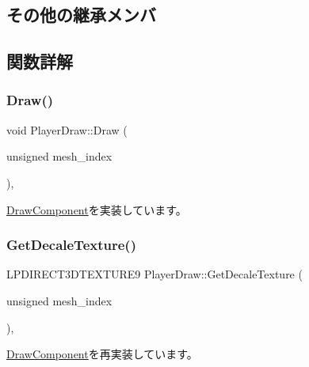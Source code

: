 \subsection*{その他の継承メンバ}


\subsection{関数詳解}
\mbox{\label{class_player_draw_a1d58f14658bf5e058f67c6754d9898e7}} 
\subsubsection{\texorpdfstring{Draw()}{Draw()}}
{\footnotesize\ttfamily void Player\+Draw\+::\+Draw (\begin{DoxyParamCaption}\item[{unsigned}]{mesh\+\_\+index }\end{DoxyParamCaption})\hspace{0.3cm}{\ttfamily [override]}, {\ttfamily [virtual]}}



\mbox{\hyperlink{class_draw_component_ae84bfb6ccc2fda9e54cdff45057ea2c3}{Draw\+Component}}を実装しています。

\mbox{\label{class_player_draw_af139860a0e62553110f939a62d7b5e8e}} 
\subsubsection{\texorpdfstring{Get\+Decale\+Texture()}{GetDecaleTexture()}}
{\footnotesize\ttfamily L\+P\+D\+I\+R\+E\+C\+T3\+D\+T\+E\+X\+T\+U\+R\+E9 Player\+Draw\+::\+Get\+Decale\+Texture (\begin{DoxyParamCaption}\item[{unsigned}]{mesh\+\_\+index }\end{DoxyParamCaption})\hspace{0.3cm}{\ttfamily [override]}, {\ttfamily [virtual]}}



\mbox{\hyperlink{class_draw_component_a9ea98f4bcdfd76782d5234122b132c3d}{Draw\+Component}}を再実装しています。

